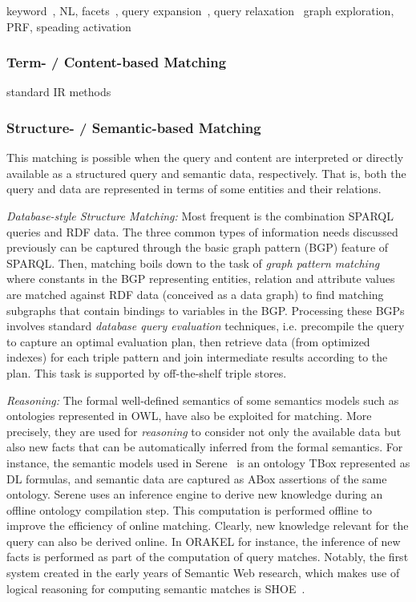 	 keyword~\cite{DBLP:conf/sigmod/LiJLF09,DBLP:conf/sigir/BastCSW07,DBLP:conf/sigmod/PoundIW10}, NL, facets~\cite{DBLP:conf/sigir/BastCSW07}, query expansion~\cite{DBLP:series/sci/NgoC10}, query relaxation~\cite{DBLP:conf/esws/ElbassuoniRW11} graph exploration, PRF, speading activation~\cite{DBLP:conf/aaai/JiangT06,DBLP:conf/esws/SchumacherSS08,DBLP:conf/www/RochaSA04}
	
	
	\subsubsection{Term- / Content-based Matching} standard IR methods
	\subsubsection{Structure- / Semantic-based Matching} 
	This matching is possible when the query and content are interpreted or directly available as a structured query and semantic data, respectively. That is, both the query and data are represented in terms of some entities and their relations. 
	
	\emph{Database-style Structure Matching:} Most frequent is the combination SPARQL queries and RDF data. The three common types of information needs discussed previously can be captured through the basic graph pattern (BGP) feature of SPARQL. Then, matching boils down to the task of \emph{graph pattern matching} where constants in the BGP representing entities, relation and attribute values are matched against RDF data (conceived as a data graph) to find matching subgraphs that contain bindings to variables in the BGP. Processing these BGPs involves standard \emph{database query evaluation} techniques, i.e. precompile the query to capture an optimal evaluation plan, then retrieve data (from optimized indexes) for each triple pattern and join intermediate results according to the plan. This task is supported by off-the-shelf triple stores. 
	
	\emph{Reasoning:} The formal well-defined semantics of some semantics models such as ontologies represented in OWL, have also be exploited for matching. More precisely, they are used for \emph{reasoning} to consider not only the available data but also new facts that can be automatically inferred from the formal semantics. For instance, the semantic models used in Serene~\cite{DBLP:journals/ws/FazzingaGGL11} is an ontology TBox represented as DL formulas, and semantic data are captured as ABox assertions of the same ontology. Serene uses an inference engine to derive new knowledge during an offline ontology compilation step. This computation is performed offline to improve the efficiency of online matching. Clearly, new knowledge relevant for the query can also be derived online. In ORAKEL for instance, the inference of new facts is performed as part of the computation of query matches. Notably, the first system created in the early years of Semantic Web research, which makes use of logical reasoning for computing semantic matches is SHOE~\cite{DBLP:conf/dagstuhl/HeflinHL03}. 
	
